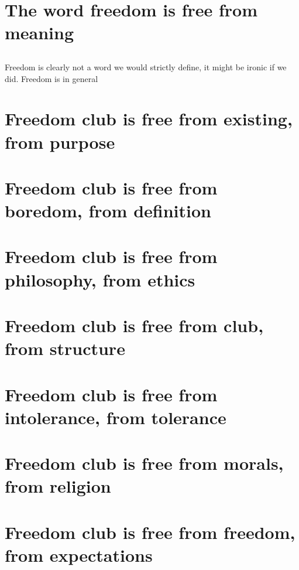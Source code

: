 \documentclass[letter]{article}
\begin{document}
\section{The word freedom is free from meaning}
\subsection{}
Freedom is clearly not a word we would strictly define, it might be ironic if we did. Freedom is in general
\section{Freedom club is free from existing, from purpose}
\section{Freedom club is free from boredom, from definition}
\section{Freedom club is free from philosophy, from ethics}
\section{Freedom club is free from club, from structure}
\section{Freedom club is free from intolerance, from tolerance}
\section{Freedom club is free from morals, from religion}
\section{Freedom club is free from freedom, from expectations}
\subsection{}
\end{document}
